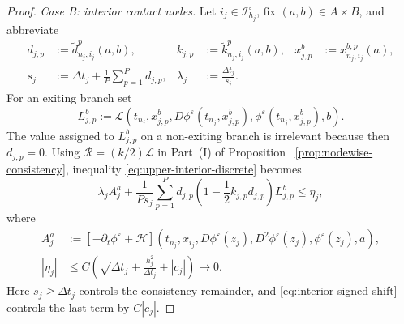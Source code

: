 \documentclass[11pt]{article}
\theoremstyle{definition}
\theoremstyle{remark}
\newcommand{\dt}{\Delta t}
\begin{document}
\begin{proof}
		\smallskip
		\noindent\textit{Case B: interior contact nodes.}
		Let $i_j\in\mathcal I_{h_j}^\circ$, fix $(a,b)\in A\times B$, and abbreviate
		\[
		\begin{aligned}
			d_{j,p}&:=\widetilde d_{n_j,i_j}^p(a,b),&
			k_{j,p}&:=\widetilde k_{n_j,i_j}^p(a,b),&
			x_{j,p}^b&:=x_{n_j,i_j}^{b,p}(a),\\
			s_j&:=\dt_j+\frac1P\sum_{p=1}^P d_{j,p},&
			\lambda_j&:=\frac{\dt_j}{s_j}.&&
		\end{aligned}
		\]
		For an exiting branch set
		\[
		L_{j,p}^b:=\mathcal L(t_{n_j},x_{j,p}^b,
		D\phi^\varepsilon(t_{n_j},x_{j,p}^b),
		\phi^\varepsilon(t_{n_j},x_{j,p}^b),b).
		\]
		The value assigned to $L_{j,p}^b$ on a non-exiting branch is irrelevant
		because then $d_{j,p}=0$.  Using
		$\mathcal R=(k/2)\mathcal L$ in Part~\textup{(I)} of Proposition
		~\ref{prop:nodewise-consistency}, inequality
		\eqref{eq:upper-interior-discrete} becomes
		\begin{equation}
			\lambda_j A_j^a+\frac1{Ps_j}\sum_{p=1}^P d_{j,p}
			\left(1-\frac12k_{j,p}d_{j,p}\right)L_{j,p}^b
			\le\eta_j,
			\label{eq:sub-normalized}
		\end{equation}
		where
		\begin{align*}
			A_j^a&:=[-\partial_t\phi^\varepsilon+\mathcal H]
			(t_{n_j},x_{i_j},D\phi^\varepsilon(z_j),D^2\phi^\varepsilon(z_j),
			\phi^\varepsilon(z_j),a),\\
			|\eta_j|&\le C\left(
			\sqrt{\dt_j}+\frac{h_j^2}{\dt_j}+|c_j|\right)\longrightarrow0.
		\end{align*}
		Here $s_j\ge\dt_j$ controls the consistency remainder, and
		\eqref{eq:interior-signed-shift} controls the last term by $C|c_j|$.
		

\end{proof}
\end{document}

